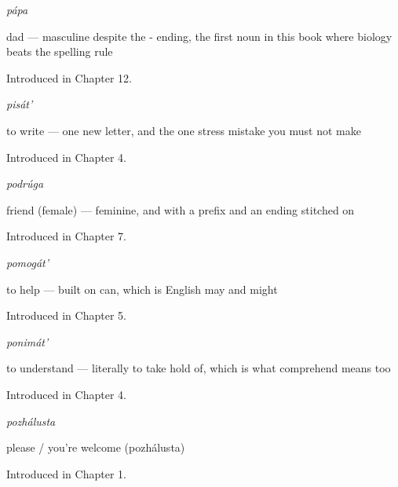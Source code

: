 \noindent\begin{minipage}[t]{\linewidth}
\raggedright
\textbf{}\enspace\emph{pápa}\par
\small dad — masculine despite the - ending, the first noun in this book where biology beats the spelling rule\par
\footnotesize Introduced in Chapter 12.
\end{minipage}\par\medskip

\noindent\begin{minipage}[t]{\linewidth}
\raggedright
\textbf{}\enspace\emph{pisát'}\par
\small to write — one new letter, and the one stress mistake you must not make\par
\footnotesize Introduced in Chapter 4.
\end{minipage}\par\medskip

\noindent\begin{minipage}[t]{\linewidth}
\raggedright
\textbf{}\enspace\emph{podrúga}\par
\small friend (female) — feminine, and  with a prefix and an ending stitched on\par
\footnotesize Introduced in Chapter 7.
\end{minipage}\par\medskip

\noindent\begin{minipage}[t]{\linewidth}
\raggedright
\textbf{}\enspace\emph{pomogát'}\par
\small to help — built on can, which is English may and might\par
\footnotesize Introduced in Chapter 5.
\end{minipage}\par\medskip

\noindent\begin{minipage}[t]{\linewidth}
\raggedright
\textbf{}\enspace\emph{ponimát'}\par
\small to understand — literally to take hold of, which is what comprehend means too\par
\footnotesize Introduced in Chapter 4.
\end{minipage}\par\medskip

\noindent\begin{minipage}[t]{\linewidth}
\raggedright
\textbf{}\enspace\emph{pozhálusta}\par
\small please / you're welcome (pozhálusta)\par
\footnotesize Introduced in Chapter 1.
\end{minipage}\par\medskip


